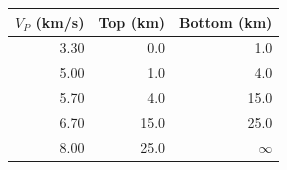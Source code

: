 \begin{tabular}{rrr}
\toprule
$V_P$ (km/s) & Top (km) & Bottom (km)\\
\midrule
3.30 & 0.0 & 1.0\\
5.00 & 1.0 & 4.0\\
5.70 & 4.0 & 15.0\\
6.70 & 15.0 & 25.0\\
8.00 & 25.0 & $\infty$\\
\bottomrule
\end{tabular}
